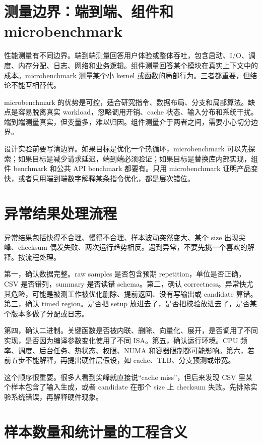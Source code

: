 \section{测量边界：端到端、组件和 microbenchmark}

性能测量有不同边界。端到端测量回答用户体验或整体吞吐，包含启动、I/O、调度、内存分配、日志、网络和业务逻辑。组件测量回答某个模块在真实上下文中的成本。microbenchmark 测量某个小 kernel 或函数的局部行为。三者都重要，但结论不能互相替代。

microbenchmark 的优势是可控，适合研究指令、数据布局、分支和局部算法。缺点是容易脱离真实 workload，忽略调用开销、cache 状态、输入分布和系统干扰。端到端测量真实，但变量多，难以归因。组件测量介于两者之间，需要小心切分边界。

设计实验前要写清边界。如果目标是优化一个热循环，microbenchmark 可以先探索；如果目标是减少请求延迟，端到端必须验证；如果目标是替换库内部实现，组件 benchmark 和公共 API benchmark 都要有。只用 microbenchmark 证明产品变快，或者只用端到端数字解释某条指令优化，都是层次错位。

\section{异常结果处理流程}

异常结果包括快得不合理、慢得不合理、样本波动突然变大、某个 size 出现尖峰、checksum 偶发失败、两次运行趋势相反。遇到异常，不要先挑一个喜欢的解释。按流程处理。

第一，确认数据完整。raw samples 是否包含预期 repetition，单位是否正确，CSV 是否错列，summary 是否读错 schema。第二，确认 correctness。异常快尤其危险，可能是被测工作被优化删除、提前返回、没有写输出或 candidate 算错。第三，确认 timed region。是否把 setup 放进去了，是否把校验放进去了，是否某个版本多做了分配或日志。

第四，确认二进制。关键函数是否被内联、删除、向量化、展开，是否调用了不同实现，是否因为编译参数变化使用了不同 ISA。第五，确认运行环境。CPU 频率、调度、后台任务、热状态、权限、NUMA 和容器限制都可能影响。第六，若前五步不能解释，再提出硬件层假设，如 cache、TLB、分支预测或带宽。

这个顺序很重要。很多人看到尖峰就直接说“cache miss”，但后来发现 CSV 里某个样本包含了输入生成，或者 candidate 在那个 size 上 checksum 失败。先排除实验系统错误，再解释硬件现象。

\section{样本数量和统计量的工程含义}


